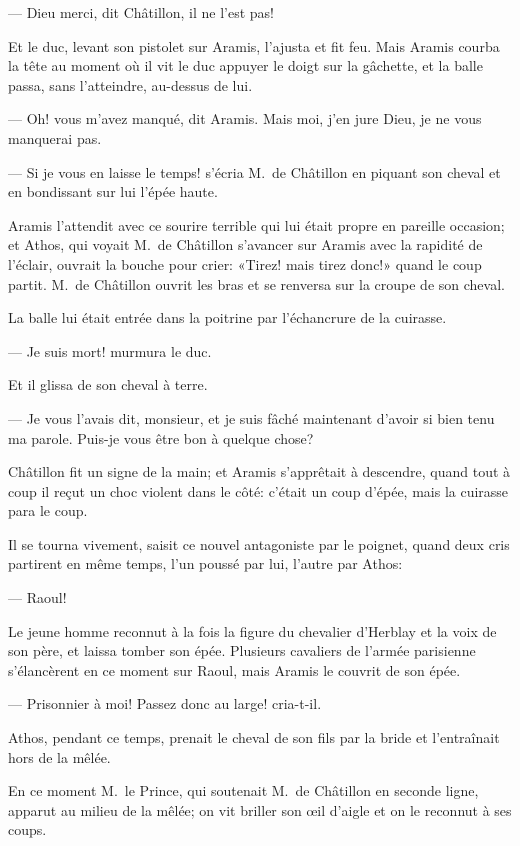 — Dieu merci, dit Châtillon, il ne l'est pas!

Et le duc, levant son pistolet sur Aramis, l'ajusta et fit feu. Mais Aramis courba la tête au moment où il vit le duc appuyer le doigt sur la gâchette, et la balle passa, sans l'atteindre, au-dessus de lui.

— Oh! vous m'avez manqué, dit Aramis. Mais moi, j'en jure Dieu, je ne vous manquerai pas.

— Si je vous en laisse le temps! s'écria M.~de Châtillon en piquant son cheval et en bondissant sur lui l'épée haute.

Aramis l'attendit avec ce sourire terrible qui lui était propre en pareille occasion; et Athos, qui voyait M.~de Châtillon s'avancer sur Aramis avec la rapidité de l'éclair, ouvrait la bouche pour crier: «Tirez! mais tirez donc!» quand le coup partit. M.~de Châtillon ouvrit les bras et se renversa sur la croupe de son cheval.

La balle lui était entrée dans la poitrine par l'échancrure de la cuirasse.

— Je suis mort! murmura le duc.

Et il glissa de son cheval à terre.

— Je vous l'avais dit, monsieur, et je suis fâché maintenant d'avoir si bien tenu ma parole. Puis-je vous être bon à quelque chose?

Châtillon fit un signe de la main; et Aramis s'apprêtait à descendre, quand tout à coup il reçut un choc violent dans le côté: c'était un coup d'épée, mais la cuirasse para le coup.

Il se tourna vivement, saisit ce nouvel antagoniste par le poignet, quand deux cris partirent en même temps, l'un poussé par lui, l'autre par Athos:

— Raoul!

Le jeune homme reconnut à la fois la figure du chevalier d'Herblay et la voix de son père, et laissa tomber son épée. Plusieurs cavaliers de l'armée parisienne s'élancèrent en ce moment sur Raoul, mais Aramis le couvrit de son épée.

— Prisonnier à moi! Passez donc au large! cria-t-il.

Athos, pendant ce temps, prenait le cheval de son fils par la bride et l'entraînait hors de la mêlée.

En ce moment M.~le Prince, qui soutenait M.~de Châtillon en seconde ligne, apparut au milieu de la mêlée; on vit briller son œil d'aigle et on le reconnut à ses coups.

